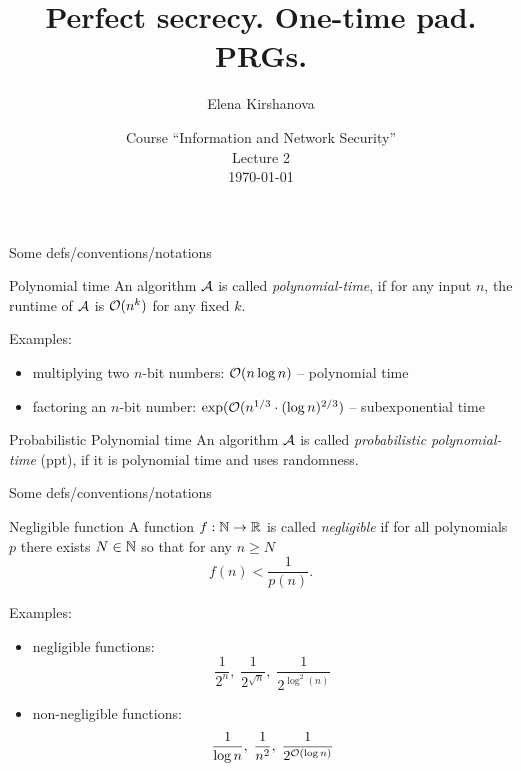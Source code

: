 \documentclass[usenames,dvipsnames, 9pt,aspectratio=169]{beamer}
\author{Elena Kirshanova \\ [10pt]
}
\title{Perfect secrecy. One-time pad. PRGs.}
\date{ Course ``Information and Network Security'' \\ 	
	Lecture 2 \\ \today }
\begin{document}
	
\begin{frame}
	\titlepage
\end{frame}


\begin{frame}{Some defs/conventions/notations}
\Large 
	\begin{block}{Polynomial time}
		An algorithm $\mathcal{A}$ is called \emph{polynomial-time}, if for any input $n$, the runtime of $\mathcal{A}$ is $\mathcal{O}(n^k)$ for any fixed $k$.
	\end{block}
\vspace{10pt}
Examples: 
\begin{itemize}
\LARGE
\item multiplying two $n$-bit numbers: $\mathcal{O}(n \log n)$ -- polynomial time
\item factoring an $n$-bit number: $\exp(\mathcal{O}(n^{1/3}\cdot (\log n)^{2/3})$ -- subexponential time
\end{itemize}
\vspace{10pt}
\Large
\pause
\begin{block}{Probabilistic Polynomial time}
	An algorithm $\mathcal{A}$ is called \emph{probabilistic polynomial-time} (ppt), if it is polynomial time and uses randomness.
\end{block} 

\end{frame}


\begin{frame} {Some defs/conventions/notations}
\Large
	\begin{block}{Negligible function}
		A function $f: {{\mathbb N}} \rightarrow {{\mathbb R}}$ is called \emph{negligible} if for all  polynomials $p$ there exists $N \in {{\mathbb N}}$ so that for any $n \geq N$
		\[
			f(n) < \frac{1}{p(n)}.
		\]
	\end{block}

	\vspace{10pt}
	Examples: 
	\begin{itemize}
		\LARGE
		\item negligible functions: 
		\[
		\frac{1}{2^n}, \; \frac{1}{2^{\sqrt{n}}}, \;  \frac{1}{2^{\log^2(n)}}
		\]
		\item non-negligible functions: 
			\[
		\frac{1}{\log n}, \;  \frac{1}{n^2}, \;  \frac{1}{2^{\mathcal{O}(\log n)}} 
		\]
	\end{itemize}
\end{frame}
\end{document}
